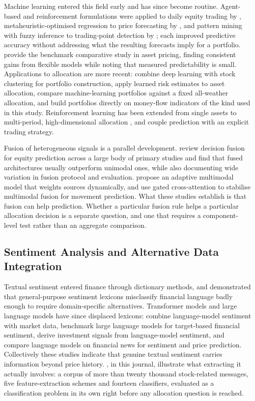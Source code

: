 \documentclass{singlecol-new}
\theoremstyle{TH}{
\newtheorem{lemma}{Lemma}
\newtheorem{theorem}[lemma]{Theorem}
\newtheorem{corrolary}[lemma]{Corrolary}
\newtheorem{conjecture}[lemma]{Conjecture}
\newtheorem{proposition}[lemma]{Proposition}
\newtheorem{claim}[lemma]{Claim}
\newtheorem{stheorem}[lemma]{Wrong Theorem}
\newtheorem{algorithm}{Algorithm}
}
\theoremstyle{THrm}{
\newtheorem{definition}{Definition}[section]
\newtheorem{question}{Question}[section]
\newtheorem{remark}{Remark}
\newtheorem{scheme}{Scheme}
}
\theoremstyle{THhit}{
\newtheorem{case}{Case}[section]
}
\begin{document}
Machine learning entered this field early and has since become routine. Agent-based
and reinforcement formulations were applied to daily equity trading by \citet{lee07},
metaheuristic-optimised regression to price forecasting by \citet{chou18}, and pattern
mining with fuzzy inference to trading-point detection by \citet{huang20}; each
improved predictive accuracy without addressing what the resulting forecasts imply for a
portfolio. \citet{gu20} provide the benchmark comparative study in asset pricing,
finding consistent gains from flexible models while noting that measured predictability
is small. Applications to allocation
are more recent: \citet{ashrafzadeh25} combine deep learning with stock clustering for
portfolio construction, \citet{agal25} apply learned risk estimates to asset
allocation, \citet{ha26} compare machine-learning portfolios against a fixed
all-weather allocation, and \citet{singsiri26} build portfolios directly on money-flow
indicators of the kind used in this study. Reinforcement learning has been extended from single assets to
multi-period, high-dimensional allocation \citep{jiang25, saijai26}, and
\citet{wang26} couple prediction with an explicit trading strategy.

Fusion of heterogeneous signals is a parallel development. \citet{zhang22} review
decision fusion for equity prediction across a large body of primary studies and find
that fused architectures usually outperform unimodal ones, while also documenting wide
variation in fusion protocol and evaluation. \citet{farimani24} propose an adaptive
multimodal model that weights sources dynamically, and \citet{zong25} use gated
cross-attention to stabilise multimodal fusion for movement prediction. What these
studies establish is that fusion can help prediction. Whether a particular fusion rule
helps a particular allocation decision is a separate question, and one that requires a
component-level test rather than an aggregate comparison.

\subsection{Sentiment Analysis and Alternative Data Integration}

Textual sentiment entered finance through dictionary methods, and
\citet{loughran11} demonstrated that general-purpose sentiment lexicons misclassify
financial language badly enough to require domain-specific alternatives. Transformer
models and large language models have since displaced lexicons: \citet{officioso26}
combine language-model sentiment with market data, \citet{muhammad26} benchmark large
language models for target-based financial sentiment, \citet{mun25} derive investment
signals from language-model sentiment, and \citet{chuang25} compare language models on
financial news for sentiment and price prediction. Collectively these studies indicate
that genuine textual sentiment carries information beyond price history.
\citet{george25}, in this journal, illustrate what extracting it actually involves: a
corpus of more than twenty thousand stock-related messages, five feature-extraction
schemes and fourteen classifiers, evaluated as a classification problem in its own
right before any allocation question is reached.
\end{document}
